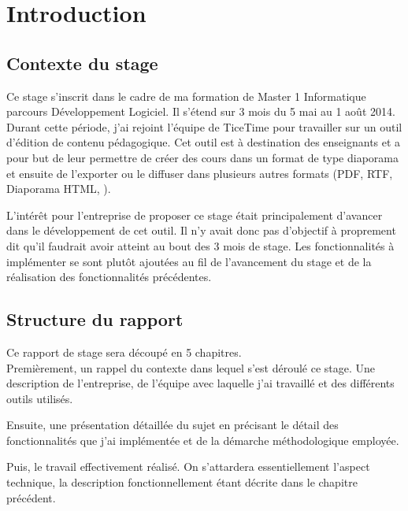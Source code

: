 \chapter*{Introduction}

\section*{Contexte du stage}
Ce stage s'inscrit dans le cadre de ma formation de Master 1 Informatique parcours
Développement Logiciel. Il s'étend sur 3 mois du 5 mai au 1\ier{} août 2014.\\

Durant cette période, j'ai rejoint l'équipe de TiceTime pour travailler sur un
outil d'édition de contenu pédagogique. Cet outil est à destination des
enseignants et a pour but de leur permettre de créer des cours dans un format de
type diaporama et ensuite de l'exporter ou le diffuser dans plusieurs autres formats
(PDF, RTF, Diaporama HTML, ).

L'intérêt pour l'entreprise de proposer ce stage était principalement d'avancer
dans le développement de cet outil. Il n'y avait donc pas d'objectif à
proprement dit qu'il faudrait avoir atteint au bout des 3 mois de stage. Les
fonctionnalités à implémenter se sont plutôt ajoutées au fil de l'avancement du
stage et de la réalisation des fonctionnalités précédentes.

\section*{Structure du rapport}

Ce rapport de stage sera découpé en 5 chapitres.\\

Premièrement, un rappel du contexte dans lequel s'est déroulé ce stage. Une
description de l'entreprise, de l'équipe avec laquelle j'ai travaillé et des
différents outils utilisés.

Ensuite, une présentation détaillée du sujet en précisant le détail des
fonctionnalités que j'ai implémentée et de la démarche méthodologique
employée. %

Puis, le travail effectivement réalisé. On s'attardera essentiellement l'aspect
technique, la description fonctionnellement étant décrite dans le chapitre
précédent.

